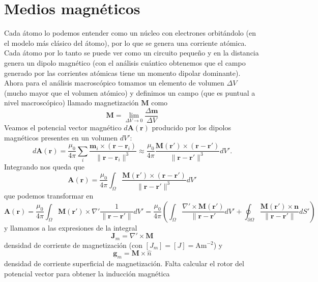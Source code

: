 \documentclass[11pt,a4paper]{article}
\numberwithin{equation}{section}
\begin{document}
\section{Medios magnéticos}
Cada átomo lo podemos entender como un núcleo con electrones orbitándolo (en el modelo más clásico del átomo), por lo que se genera una corriente atómica. Cada átomo por lo tanto se puede ver como un circuito pequeño y en la distancia genera un dipolo magnético (con el análisis cuántico obtenemos que el campo generado por las corrientes atómicas tiene un momento dipolar dominante). Ahora para el análisis macroscópico tomamos un elemento de volumen $\Delta V$ (mucho mayor que el volumen atómico) y definimos un campo (que es puntual a nivel macroscópico) llamado magnetización $\textbf{M}$ como 
\begin{equation}
    \textbf{M} = \lim_{\Delta V \to 0} \frac{\Delta \textbf{m}}{\Delta V}
    \label{eq:m_magnetizacion}
\end{equation}
Veamos el potencial vector magnético $d\textbf{A}(\textbf{r})$ producido por los dipolos magnéticos presentes en un volumen $dV'$: \[d\textbf{A}(\textbf{r}) = \frac{\mu_0}{4\pi} \sum_i \frac{\textbf{m}_i \times (\textbf{r} - \textbf{r}_i)}{\|\textbf{r} - \textbf{r}_i\|^3} \approx \frac{\mu_0}{4\pi} \frac{\textbf{M}(\textbf{r}') \times (\textbf{r} - \textbf{r}')}{\|\textbf{r} - \textbf{r}'\|^3} dV'.\] Integrando nos queda que
\begin{equation}
    \textbf{A}(\textbf{r}) = \frac{\mu_0}{4\pi} \int_{\Omega} \frac{\textbf{M}(\textbf{r}') \times (\textbf{r} - \textbf{r}')}{\|\textbf{r} - \textbf{r}'\|^3} dV'
    \label{eq:m_potencial_vector_materia}
\end{equation}
que podemos transformar en \[\textbf{A}(\textbf{r}) = \frac{\mu_0}{4\pi} \int_{\Omega} \textbf{M}(\textbf{r}') \times \nabla'\frac{1}{\|\textbf{r} - \textbf{r}'\|} dV' = \frac{\mu_0}{4\pi} \left(\int_{\Omega} \frac{\nabla' \times \textbf{M}(\textbf{r}')}{\|\textbf{r} - \textbf{r}'} dV' + \oint_{\partial \Omega} \frac{\textbf{M}(\textbf{r}') \times \textbf{n}}{\|\textbf{r} - \textbf{r}'\|} dS'\right)\]
y llamamos a las expresiones de la integral
\begin{equation}
    \textbf{J}_m = \nabla' \times \textbf{M}
    \label{eq:m_corriente_magnetizacion}
\end{equation}
densidad de corriente de magnetización (con $[J_m] = [J] = \text{A}\text{m}^{-2}$) y 
\begin{equation}
    \textbf{g}_m = \textbf{M} \times \hat{n}
    \label{eq:m_corriente_magnetizacion_superficie}
\end{equation}
densidad de corriente superficial de magnetización. Falta calcular el rotor del potencial vector para obtener la inducción magnética 
\end{document}
